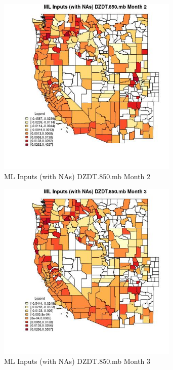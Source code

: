 \begin{figure} 
\centering  
\includegraphics[width=0.77\textwidth]{Code_Outputs/Report_ML_input_PM25_Step4_part_f_de_duplicated_aveswNAs_CountyDZDT850mbmedianMonth2.jpg} 
\caption{\label{fig:Report_ML_input_PM25_Step4_part_f_de_duplicated_aveswNAsCountyDZDT850mbmedianMonth2}ML Inputs (with NAs) DZDT.850.mb Month 2} 
\end{figure} 
 

\begin{figure} 
\centering  
\includegraphics[width=0.77\textwidth]{Code_Outputs/Report_ML_input_PM25_Step4_part_f_de_duplicated_aveswNAs_CountyDZDT850mbmedianMonth3.jpg} 
\caption{\label{fig:Report_ML_input_PM25_Step4_part_f_de_duplicated_aveswNAsCountyDZDT850mbmedianMonth3}ML Inputs (with NAs) DZDT.850.mb Month 3} 
\end{figure} 
 

